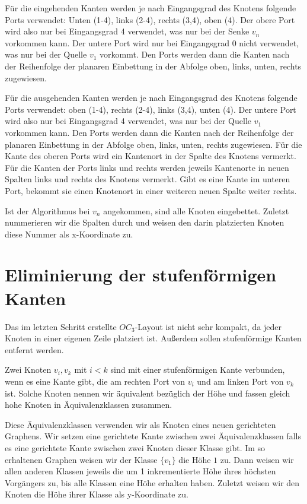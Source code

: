 \documentclass[a4paper]{scrreprt}
\theoremstyle{definition}
\begin{document}
Für die eingehenden Kanten werden je nach Eingangsgrad des Knotens folgende Ports verwendet: Unten (1-4), links (2-4), rechts (3,4), oben (4). Der obere Port wird also nur bei Eingangsgrad 4 verwendet, was nur bei der Senke $v_n$ vorkommen kann. Der untere Port wird nur bei Eingangsgrad 0 nicht verwendet, was nur bei der Quelle $v_1$ vorkommt. Den Ports werden dann die Kanten nach der Reihenfolge der planaren Einbettung in der Abfolge oben, links, unten, rechts zugewiesen.

Für die ausgehenden Kanten werden je nach Eingangsgrad des Knotens folgende Ports verwendet: oben (1-4), rechts (2-4), links (3,4), unten (4). Der untere Port wird also nur bei Eingangsgrad 4 verwendet, was nur bei der Quelle $v_1$ vorkommen kann. Den Ports werden dann die Kanten nach der Reihenfolge der planaren Einbettung in der Abfolge oben, links, unten, rechts zugewiesen. 
Für die Kante des oberen Ports wird ein Kantenort in der Spalte des Knotens vermerkt. Für die Kanten der Ports links und rechts werden jeweils Kantenorte in neuen Spalten links und rechts des Knotens vermerkt. Gibt es eine Kante im unteren Port, bekommt sie einen Knotenort in einer weiteren neuen Spalte weiter rechts. %

Ist der Algorithmus bei $v_n$ angekommen, sind alle Knoten eingebettet. Zuletzt nummerieren wir die Spalten durch und weisen den darin platzierten Knoten diese Nummer als x-Koordinate zu. 

\section{Eliminierung der stufenförmigen Kanten}

Das im letzten Schritt erstellte $OC_3$-Layout ist nicht sehr kompakt, da jeder Knoten in einer eigenen Zeile platziert ist. Außerdem sollen stufenförmige Kanten entfernt werden.

Zwei Knoten $v_i, v_k$ mit $i < k$ sind mit einer stufenförmigen Kante verbunden, wenn es eine Kante gibt, die am rechten Port von $v_i$ und am linken Port von $v_k$ ist. Solche Knoten nennen wir äquivalent bezüglich der Höhe und fassen gleich hohe Knoten in Äquivalenzklassen zusammen.

Diese Äquivalenzklassen verwenden wir als Knoten eines neuen gerichteten Graphens. Wir setzen eine gerichtete Kante zwischen zwei Äquivalenzklassen falls es eine gerichtete Kante zwischen zwei Knoten dieser Klasse gibt. Im so erhaltenen Graphen weisen wir der Klasse $\{v_1\}$ die Höhe $1$ zu. Dann weisen wir allen anderen Klassen jeweils die um 1 inkrementierte Höhe ihres höchsten Vorgängers zu, bis alle Klassen eine Höhe erhalten haben. Zuletzt weisen wir den Knoten die Höhe ihrer Klasse als y-Koordinate zu.
\end{document}
